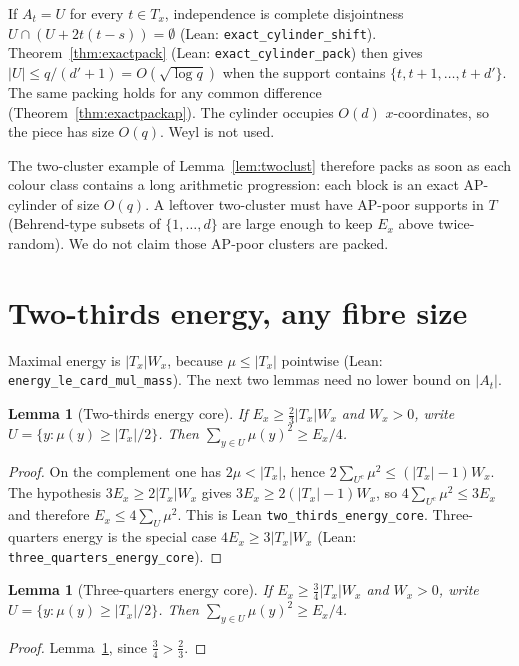 \documentclass[11pt]{article}
\newtheorem{lemma}[theorem]{Lemma}
\theoremstyle{definition}
\begin{document}
If $A_t=U$ for every $t\in T_x$, independence is complete disjointness
$U\cap(U+2t(t-s))=\emptyset$ (Lean: \texttt{exact\_cylinder\_shift}).
Theorem~\ref{thm:exactpack} (Lean: \texttt{exact\_cylinder\_pack}) then gives
$|U|\le q/(d'+1)=O(\sqrt{\log q})$ when the support contains $\{t,t+1,\dots,t+d'\}$.
The same packing holds for any common difference (Theorem~\ref{thm:exactpackap}).
The cylinder occupies $O(d)$ $x$-coordinates, so the piece has size $O(q)$.
Weyl is not used.

The two-cluster example of Lemma~\ref{lem:twoclust} therefore packs as soon as
each colour class contains a long arithmetic progression:
each block is an exact AP-cylinder of size $O(q)$.
A leftover two-cluster must have AP-poor supports in $T$
(Behrend-type subsets of $\{1,\dots,d\}$ are large enough to keep
$E_x$ above twice-random).
We do not claim those AP-poor clusters are packed.

\section{Two-thirds energy, any fibre size}

Maximal energy is $|T_x|W_x$, because $\mu\le|T_x|$ pointwise
(Lean: \texttt{energy\_le\_card\_mul\_mass}).
The next two lemmas need no lower bound on $|A_t|$.

\begin{lemma}[Two-thirds energy core]\label{lem:23core}
If $E_x\ge\tfrac23|T_x|W_x$ and $W_x>0$, write
$U=\{y:\mu(y)\ge|T_x|/2\}$.
Then $\sum_{y\in U}\mu(y)^{2}\ge E_x/4$.
\end{lemma}

\begin{proof}
On the complement one has $2\mu<|T_x|$, hence
$2\sum_{U^{c}}\mu^{2}\le(|T_x|-1)W_x$.
The hypothesis $3E_x\ge 2|T_x|W_x$ gives
$3E_x\ge 2(|T_x|-1)W_x$, so
$4\sum_{U^{c}}\mu^{2}\le 3E_x$ and therefore
$E_x\le 4\sum_U\mu^{2}$.
This is Lean \texttt{two\_thirds\_energy\_core}.
Three-quarters energy is the special case
$4E_x\ge 3|T_x|W_x$ (Lean: \texttt{three\_quarters\_energy\_core}).
\end{proof}

\begin{lemma}[Three-quarters energy core]\label{lem:34core}
If $E_x\ge\tfrac34|T_x|W_x$ and $W_x>0$, write
$U=\{y:\mu(y)\ge|T_x|/2\}$.
Then $\sum_{y\in U}\mu(y)^{2}\ge E_x/4$.
\end{lemma}

\begin{proof}
Lemma~\ref{lem:23core}, since $\tfrac34>\tfrac23$.
\end{proof}
\end{document}
